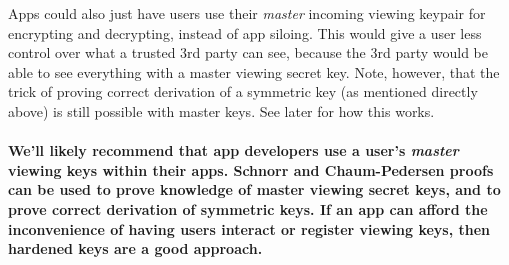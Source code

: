 \noindent
Apps could also just have users use their \textit{master} incoming viewing keypair for encrypting and decrypting, instead of app siloing.
This would give a user less control over what a trusted 3rd party can see, because the 3rd party would be able to see everything with a master viewing secret key.
Note, however, that the trick of proving correct derivation of a symmetric key (as mentioned directly above) is still possible with master keys. See later for how this works.\\
\\
\textbf{We'll likely recommend that app developers use a user's \textit{master} viewing keys within their apps.
Schnorr and Chaum-Pedersen proofs can be used to prove knowledge of master viewing secret keys, and to prove correct derivation of symmetric keys.
If an app can afford the inconvenience of having users interact or register viewing keys, then hardened keys are a good approach.}







